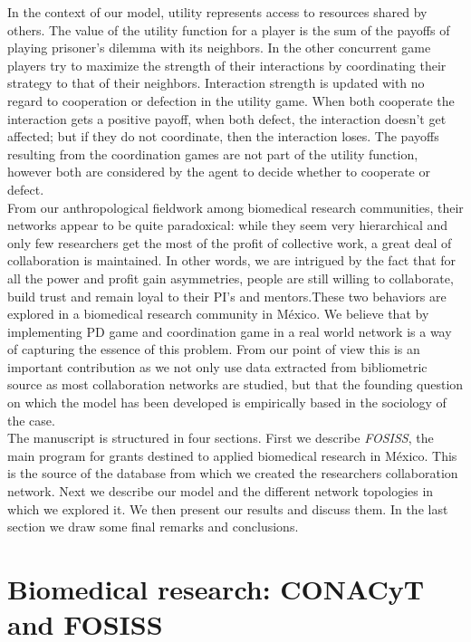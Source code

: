 \documentclass{bmcart}
\begin{document}
In the context of our model, utility represents access to resources
shared by others. The value of the utility function for a player is
the sum of the payoffs of playing prisoner's dilemma with its
neighbors. In the other concurrent game players try to maximize the
strength of their interactions by coordinating their strategy to that
of their neighbors. Interaction strength is updated with no regard to
cooperation or defection in the utility game. When both cooperate the
interaction gets a positive payoff, when both defect, the interaction
doesn't get affected; but if they do not coordinate, then the
interaction loses. The payoffs resulting from the coordination games
are not part of the utility function, however both are considered by
the agent to decide whether to cooperate or defect. \\

{\color {red}From our anthropological fieldwork among biomedical research communities, their
networks appear to be quite paradoxical: while they seem very
hierarchical and only few researchers get the most of the profit of collective
work, a great deal of collaboration is maintained. In other words, we are
intrigued by the fact that for all the power and profit gain asymmetries,
people are still willing to collaborate, build trust and remain loyal to their
PI's and mentors.These two behaviors are explored in a biomedical research
community in M\'exico. We believe that by implementing PD game and coordination
game in a real world network is a way of capturing the essence of this
problem. From our point of view this is an important contribution as we not only
use data extracted from bibliometric source as most collaboration networks are
studied, but that the founding question on which the model has been developed is
empirically based in the sociology of the case.}\\

The manuscript is structured in four sections. First we describe
\textit{FOSISS}, the main program for grants destined to applied
biomedical research in M\'exico. This is the source of the database
from which we created the researchers collaboration network. Next we
describe our model and the different network topologies in which we
explored it.  We then present our results and discuss them. In the
last section we draw some final remarks and conclusions.

\section*{Biomedical research: CONACyT and FOSISS}
\end{document}
